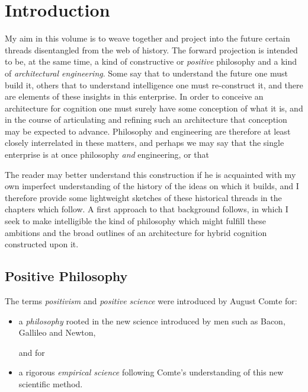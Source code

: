 \chapter{Introduction}\label{Introduction}

My aim in this volume is to weave together and project into the future certain threads disentangled from the web of history.
The forward projection is intended to be, at the same time, a kind of constructive or {\it positive} philosophy and a kind of {\it architectural engineering}.
Some say that to understand the future one must build it, others that to understand intelligence one must re-construct it, and there are elements of these insights in this enterprise.
In order to conceive an architecture for cognition one must surely have some conception of what it is, and in the course of articulating and refining such an architecture that conception may be expected to advance.
Philosophy and engineering are therefore at least closely interrelated in these matters, and perhaps we may say that the single enterprise is at once philosophy {\it and} engineering, or that

The reader may better understand this construction if he is acquainted with my own imperfect understanding of the history of the ideas on which it builds, and I therefore provide some lightweight sketches of these historical threads in the chapters which follow.
A first approach to that background follows, in which I seek to make intelligible the kind of philosophy which might fulfill these ambitions and the broad outlines of an architecture for hybrid cognition constructed upon it.


\section{Positive Philosophy}

The terms {\it positivism} and {\it positive science} were introduced by August Comte for:
\begin{itemize}
\item a {\it philosophy} rooted in the new science introduced by men such as Bacon, Gallileo and Newton,

and for
\item a rigorous {\it empirical science} following Comte's understanding of this new scientific method.
\end{itemize}

